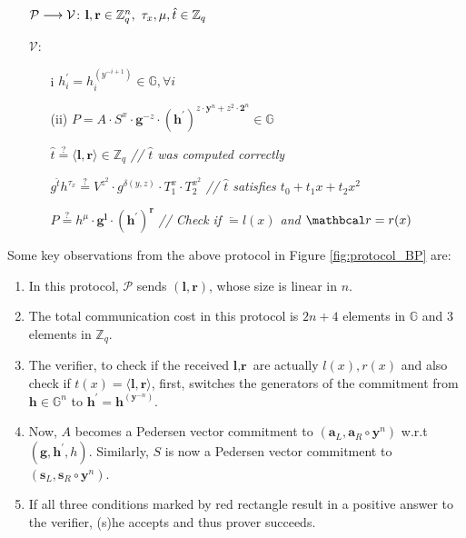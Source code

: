 \begin{mdframed}
\begin{itemize}[itemsep=4pt]
    \item[] $\mathcal{P} \longrightarrow \mathcal{V}$: $ \textbf{l},\textbf{r} \in \mathbb{Z}_q^n, \ \tau_x, \mu, \hat{t} \in \mathbb{Z}_q$
    
    \item[] $\mathcal{V}$: 
    \begin{enumerate}[itemsep=5pt]
        \item[i] $h^{\prime}_i = h_i^{(y^{-i+1})} \in \mathbb{G}, \forall i$
        \item[(ii)] $P = A\cdot S^x \cdot \textbf{g}^{-z} \cdot
        (\textbf{h}^{\prime})^{z\cdot \textbf{y}^n + z^2 \cdot \textbf{2}^n} \in \mathbb{G}$
          
        $\hat{t} \stackrel{?}{=}
        \langle \textbf{l},\textbf{r}\rangle \in \mathbb{Z}_q$
        \hfill{{\small \textit{// $\hat{t}$ was computed correctly}}}

        $ g^{\hat{t}}
        h^{\tau_x} 
        \stackrel{?}{=}
        V^{z^2} 
        \cdot
        g^{\delta(y,z)} 
        \cdot 
        T_1^{x} 
        \cdot 
        T_2^{x^2}$
        \hfill{{\small \textit{// $\hat{t}$ satisfies $t_0 + t_1x + t_2x^2$}}} 

        $P \stackrel{?}{=}
        h^{\mu} \cdot \textbf{g}^{\textbf{l}} \cdot (\textbf{h}^{\prime})^{\textbf{r}}$
        \hfill{{\small \textit{// Check if $\lvec = l(x)$ and $\rvec = r(x)$}}}
        
    \end{enumerate}
\end{itemize}
\end{mdframed}
\vspace{1cm}
Some key observations from the above protocol in Figure \ref{fig:protocol_BP} are:
\begin{enumerate}
    \item In this protocol, $\mathcal{P}$ sends $(\textbf{l}, \textbf{r})$, whose size is linear in $n$.
    \item The total communication cost in this protocol is $2n+4$ elements in $\mathbb{G}$ and $3$ elements in $\mathbb{Z}_q$.
    \item The verifier, to check if the received $\textbf{l}, \textbf{r}$ are actually $l(x), r(x)$ and also check if $t(x)=\langle \textbf{l}, \textbf{r}\rangle$, first, switches the generators of the commitment from $\textbf{h} \in \mathbb{G}^n$ to $\textbf{h}^{\prime} = \textbf{h}^{(\textbf{y}^{-n})}$.   
    \item Now, $A$ becomes a Pedersen vector commitment to $(\textbf{a}_L, \textbf{a}_R \circ \textbf{y}^n)$ w.r.t $(\textbf{g}, \textbf{h}^{\prime}, h)$. Similarly, $S$ is now a Pedersen vector commitment to $(\textbf{s}_L, \textbf{s}_R \circ \textbf{y}^n)$.
    \item If all three conditions marked by red rectangle result in a positive answer to the verifier, (s)he accepts and thus prover succeeds.
\end{enumerate}

